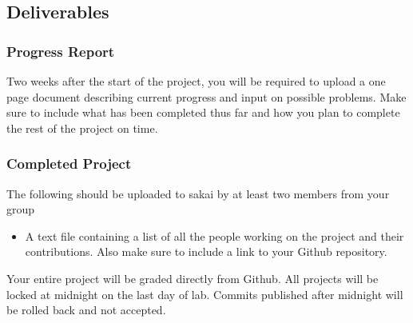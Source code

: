 \subsection{Deliverables}
\subsubsection{Progress Report}

Two weeks after the start of the project, you will be required to upload a one page document describing current progress and input on possible problems. Make sure to include what has been completed thus far and how you plan to complete the rest of the project on time.

\subsubsection{Completed Project}
The following should be uploaded to sakai by at least two members from your group

\begin{itemize}
	\item A text file containing a list of all the people working on the project and their contributions. Also make sure to include a link to your Github repository.
\end{itemize}

Your entire project will be graded directly from Github. All projects will be locked at midnight on the last day of lab. Commits published after midnight will be rolled back and not accepted. 